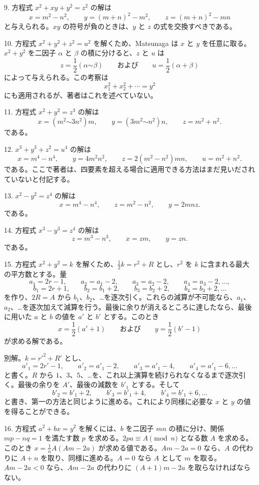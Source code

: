 \documentclass[11pt]{article}
\newcommand{\scanpage}[2]{\clearpage\setcounter{footnote}{0}\noindent{\footnotesize\color{gray}PDF #1 頁 · #2}\par\medskip}
\newcommand{\scanfooter}{}
\begin{document}
9. 方程式 $x^2+xy+y^2=z^2$ の解は
\[
x=m^2-n^2,\qquad y=(m+n)^2-m^2,\qquad z=(m+n)^2-mn
\]
と与えられる。$xy$ の符号が負のときは、$y$ と $z$ の式を交換すべきである。

10. 方程式 $x^2+y^2+z^2=u^2$ を解くため、Matsunaga は $x$ と $y$ を任意に取る。$x^2+y^2$ を二因子 $\alpha$ と $\beta$ の積に分けると、$z$ と $u$ は
\[
z=\frac12(\alpha\mathord{\sim}\beta)\qquad\text{および}\qquad u=\frac12(\alpha+\beta)
\]
によって与えられる。この考察は
\[
x_1^2+x_2^2+\cdots=y^2
\]
にも適用されるが、著者はこれを述べていない。

11. 方程式 $x^2+y^2=z^3$ の解は
\[
x=(m^2\mathord{\sim}3n^2)m,\qquad y=(3m^2\mathord{\sim}n^2)n,\qquad z=m^2+n^2.
\]
である。

12. $x^3+y^3+z^2=u^4$ の解は
\[
x=m^4-n^4,\qquad y=4m^2n^2,\qquad z=2(m^2-n^2)mn,\qquad u=m^2+n^2.
\]
である。ここで著者は、四要素を超える場合に適用できる方法はまだ見いだされていないと付記する。

13. $x^2-y^2=z^4$ の解は
\[
x=m^4-n^4,\qquad z=m^2-n^2,\qquad y=2mnz.
\]
である。

14. 方程式 $x^3-y^3=z^4$ の解は
\[
z=m^3-n^3,\qquad x=zm,\qquad y=zn.
\]
である。

15. 方程式 $x^2+y^2=k$ を解くため、$\frac12k=r^2+R$ とし、$r^2$ を $k$ に含まれる最大の平方数とする。量
\[
a_1=2r-1,\qquad a_2=a_1-2,\qquad a_3=a_2-2,\qquad a_4=a_3-2,\ldots,
\]
\[
b_1=2r+1,\qquad b_2=b_1+2,\qquad b_3=b_2+2,\qquad b_4=b_3+2,\ldots
\]
を作り、$2R=A$ から $b_1$、$b_2$、\ldots を逐次引く。これらの減算が不可能なら、$a_1$、$a_2$、\ldots を逐次加えて減算を行う。最後に余りが消えるところに達したなら、最後に用いた $a$ と $b$ の値を $a'$ と $b'$ とする。このとき
\[
x=\frac12(a'+1)\qquad\text{および}\qquad y=\frac12(b'-1)
\]
が求める解である。
\scanfooter

\scanpage{0248}{第32章、印刷頁234}
別解。$k=r'^2+R'$ とし、
\[
a'_1=2r'-1,\qquad a'_2=a'_1-2,\qquad a'_3=a'_1-4,\qquad a'_4=a'_1-6,\ldots
\]
と書く。$R$ から $1$、$3$、$5$、\ldots を、これ以上演算を続けられなくなるまで逐次引く。最後の余りを $A'$、最後の減数を $b'_1$ とする。そして
\[
b'_2=b'_1+2,\qquad b'_3=b'_1+4,\qquad b'_4=b'_1+6,\ldots
\]
と書き、第一の方法と同じように進める。これにより同様に必要な $x$ と $y$ の値を得ることができる。

16. 方程式 $a^2+bx=y^2$ を解くには、$b$ を二因子 $mn$ の積に分け、関係 $mp-nq=1$ を満たす数 $p$ を求める。$2pa\equiv A\pmod n$ となる数 $A$ を求める。このとき $x=\frac1nA(Am-2a)$ が求める値である。$Am-2a=0$ なら、$A$ の代わりに $A+n$ を取り、同様に進める。$A=0$ なら $A$ として $m$ を取る。$Am-2a<0$ なら、$Am-2a$ の代わりに $(A+1)m-2a$ を取らなければならない。
\end{document}

